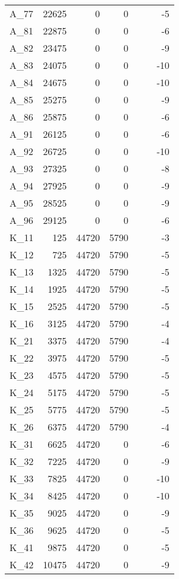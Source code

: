 \begin{tabular}{lrrrllr}
A\_77 & 22625 & 0 & 0 &  &  & -5 \\
A\_81 & 22875 & 0 & 0 &  &  & -6 \\
A\_82 & 23475 & 0 & 0 &  &  & -9 \\
A\_83 & 24075 & 0 & 0 &  &  & -10 \\
A\_84 & 24675 & 0 & 0 &  &  & -10 \\
A\_85 & 25275 & 0 & 0 &  &  & -9 \\
A\_86 & 25875 & 0 & 0 &  &  & -6 \\
A\_91 & 26125 & 0 & 0 &  &  & -6 \\
A\_92 & 26725 & 0 & 0 &  &  & -10 \\
A\_93 & 27325 & 0 & 0 &  &  & -8 \\
A\_94 & 27925 & 0 & 0 &  &  & -9 \\
A\_95 & 28525 & 0 & 0 &  &  & -9 \\
A\_96 & 29125 & 0 & 0 &  &  & -6 \\
K\_11 & 125 & 44720 & 5790 &  &  & -3 \\
K\_12 & 725 & 44720 & 5790 &  &  & -5 \\
K\_13 & 1325 & 44720 & 5790 &  &  & -5 \\
K\_14 & 1925 & 44720 & 5790 &  &  & -5 \\
K\_15 & 2525 & 44720 & 5790 &  &  & -5 \\
K\_16 & 3125 & 44720 & 5790 &  &  & -4 \\
K\_21 & 3375 & 44720 & 5790 &  &  & -4 \\
K\_22 & 3975 & 44720 & 5790 &  &  & -5 \\
K\_23 & 4575 & 44720 & 5790 &  &  & -5 \\
K\_24 & 5175 & 44720 & 5790 &  &  & -5 \\
K\_25 & 5775 & 44720 & 5790 &  &  & -5 \\
K\_26 & 6375 & 44720 & 5790 &  &  & -4 \\
K\_31 & 6625 & 44720 & 0 &  &  & -6 \\
K\_32 & 7225 & 44720 & 0 &  &  & -9 \\
K\_33 & 7825 & 44720 & 0 &  &  & -10 \\
K\_34 & 8425 & 44720 & 0 &  &  & -10 \\
K\_35 & 9025 & 44720 & 0 &  &  & -9 \\
K\_36 & 9625 & 44720 & 0 &  &  & -5 \\
K\_41 & 9875 & 44720 & 0 &  &  & -5 \\
K\_42 & 10475 & 44720 & 0 &  &  & -9 \\

\end{tabular}
